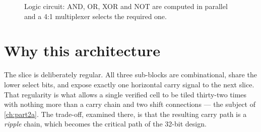 \begin{figure}[htbp]
\centering
{}
\caption{Logic circuit: AND, OR, XOR and NOT are computed in parallel and
a 4:1 multiplexer selects the required one.}
\label{fig:logic}
\end{figure}



\section{Why this architecture}
The slice is deliberately regular. All three sub-blocks are combinational,
share the lower select bits, and expose exactly one horizontal carry
signal to the next slice. That regularity is what allows a single verified
cell to be tiled thirty-two times with nothing more than a carry chain and
two shift connections --- the subject of \cref{ch:part2a}. The trade-off,
examined there, is that the resulting carry path is a \emph{ripple} chain,
which becomes the critical path of the 32-bit design.

